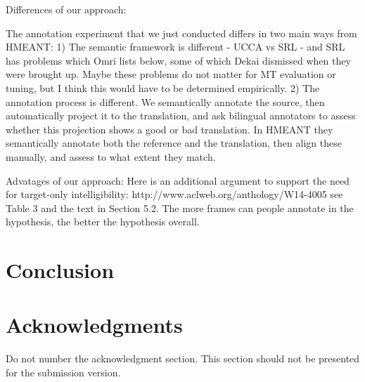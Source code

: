 \documentclass[11pt]{article}
\begin{document}
Differences of our approach:

The annotation experiment that we just conducted differs in two main ways from HMEANT:
1) The semantic framework is different - UCCA vs SRL - and SRL has problems which Omri lists below, some of which Dekai dismissed when they were brought up. Maybe these problems do not matter for MT evaluation or tuning, but I think this would have to be determined empirically.
2) The annotation process is different. We semantically annotate the source, then automatically project it to the translation, and ask bilingual annotators to assess whether this projection shows a good or bad translation. In HMEANT they semantically annotate both the reference and the translation, then align these manually, and assess to what extent they match.

Advatages of our approach:
Here is an additional argument to support the need for target-only intelligibility:
http://www.aclweb.org/anthology/W14-4005
see Table  3 and the text in Section 5.2.
The more frames can people annotate in the hypothesis, the better the hypothesis overall.


\section{Conclusion}

\section*{Acknowledgments}

Do not number the acknowledgment section.
This section should not be presented for the submission version.



\end{document}
